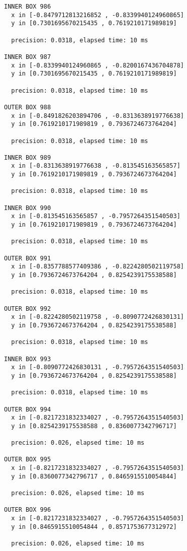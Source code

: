 \begin{verbatim}
INNER BOX 986
  x in [-0.8479712813216852 , -0.8339940124960865]
  y in [0.7301695670215435 , 0.7619210171989819]

  precision: 0.0318, elapsed time: 10 ms

INNER BOX 987
  x in [-0.8339940124960865 , -0.8200167436704878]
  y in [0.7301695670215435 , 0.7619210171989819]

  precision: 0.0318, elapsed time: 10 ms

OUTER BOX 988
  x in [-0.8491826203894706 , -0.8313638919776638]
  y in [0.7619210171989819 , 0.7936724673764204]

  precision: 0.0318, elapsed time: 10 ms

INNER BOX 989
  x in [-0.8313638919776638 , -0.813545163565857]
  y in [0.7619210171989819 , 0.7936724673764204]

  precision: 0.0318, elapsed time: 10 ms

INNER BOX 990
  x in [-0.813545163565857 , -0.7957264351540503]
  y in [0.7619210171989819 , 0.7936724673764204]

  precision: 0.0318, elapsed time: 10 ms

OUTER BOX 991
  x in [-0.8357788577409386 , -0.8224280502119758]
  y in [0.7936724673764204 , 0.8254239175538588]

  precision: 0.0318, elapsed time: 10 ms

OUTER BOX 992
  x in [-0.8224280502119758 , -0.8090772426830131]
  y in [0.7936724673764204 , 0.8254239175538588]

  precision: 0.0318, elapsed time: 10 ms

INNER BOX 993
  x in [-0.8090772426830131 , -0.7957264351540503]
  y in [0.7936724673764204 , 0.8254239175538588]

  precision: 0.0318, elapsed time: 10 ms

OUTER BOX 994
  x in [-0.8217231832334027 , -0.7957264351540503]
  y in [0.8254239175538588 , 0.8360077342796717]

  precision: 0.026, elapsed time: 10 ms

OUTER BOX 995
  x in [-0.8217231832334027 , -0.7957264351540503]
  y in [0.8360077342796717 , 0.8465915510054844]

  precision: 0.026, elapsed time: 10 ms

OUTER BOX 996
  x in [-0.8217231832334027 , -0.7957264351540503]
  y in [0.8465915510054844 , 0.8571753677312972]

  precision: 0.026, elapsed time: 10 ms


\end{verbatim}
